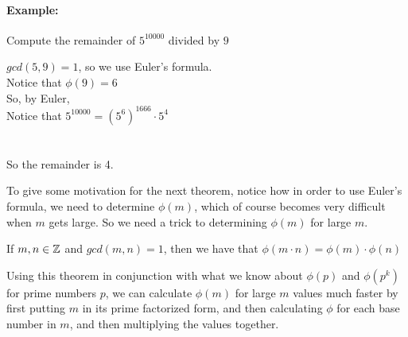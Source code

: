 \documentclass[../main.tex]{subfiles}
\begin{document}
\paragraph{Example:}
Compute the remainder of $5^{10000}$ divided by $9$
\begin{center}
    $gcd(5,9)=1$, so we use Euler's formula. \\
    Notice that $\phi(9)=6$ \\
    So, by Euler,  \\
    Notice that $5^{10000}=(5^6)^{1666} \cdot 5^4$ \\
     \\
     \\
    So the remainder is 4.
\end{center}
To give some motivation for the next theorem, notice how in order to use Euler's formula, we need to determine $\phi(m)$, which of course becomes very difficult when $m$ gets large. So we need a trick to determining $\phi(m)$ for large $m$.
\begin{thm}
    If $m,n \in \mathbb{Z}$ and $gcd(m,n)=1$, then we have that $\phi(m \cdot n) = \phi(m) \cdot \phi(n)$
\end{thm}
Using this theorem in conjunction with what we know about $\phi(p)$ and $\phi(p^k)$ for prime numbers $p$, we can calculate $\phi(m)$ for large $m$ values much faster by first putting $m$ in its prime factorized form, and then calculating $\phi$ for each base number in $m$, and then multiplying the values together.
\end{document}
